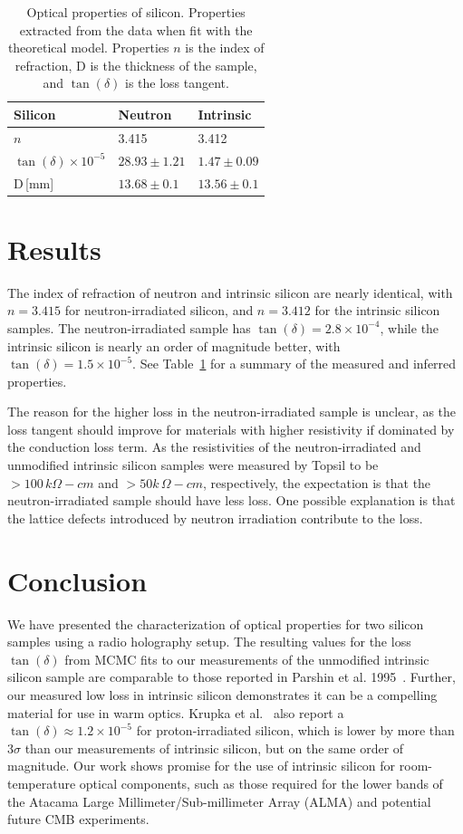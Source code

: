 \begin{table}
    \centering
\begin{tabular}{ |p{3cm}|p{3cm}|p{3cm}| }
 \hline
 Silicon & Neutron & Intrinsic\\
 \hline
  $n$ & 3.415 & 3.412 \\
 \hline
 $\tan(\delta)\times 10^{-5}$ & $28.93 \pm 1.21$ & $1.47 \pm 0.09$\\
 \hline
  D\,[mm] & $13.68 \pm 0.1 $ & $13.56 \pm 0.1$\\
 \hline
\end{tabular}
    \caption{Optical properties of silicon. Properties extracted from the data when fit with the theoretical model. Properties $n$ is the index of refraction, D is the thickness of the sample, and $\tan(\delta)$ is the loss tangent.}
    \label{tab:silicon}
\end{table}

\section{Results}
\label{sec:si_results}
The index of refraction of neutron and intrinsic silicon are nearly identical, with $n =3.415$ for neutron-irradiated silicon, and $n =3.412$ for the intrinsic silicon samples. The neutron-irradiated sample has $\tan(\delta) = 2.8\times10^{-4}$, while the intrinsic silicon is nearly an order of magnitude better, with $\tan(\delta)= 1.5 \times 10^{-5}$. See Table~\ref{tab:silicon} for a summary of the measured and inferred properties.

The reason for the higher loss in the neutron-irradiated sample is unclear, as the loss tangent should improve for materials with higher resistivity if dominated by the conduction loss term. As the resistivities of the neutron-irradiated and unmodified intrinsic silicon samples were measured by Topsil to be $>100\,k\Omega-cm$ and $>50k\,\Omega-cm$, respectively, the expectation is that the neutron-irradiated sample should have less loss. One possible explanation is that the lattice defects introduced by neutron irradiation contribute to the loss.

\section{Conclusion}
\label{sec:si_conclusion}
We have presented the characterization of optical properties for two silicon samples using a radio holography setup.  The resulting values for the loss $\tan(\delta)$ from MCMC fits to our measurements of the unmodified intrinsic silicon sample are comparable to those reported in Parshin et al. 1995~\cite{parshin}.  Further, our measured low loss in intrinsic silicon demonstrates it can be a compelling material for use in warm optics.  Krupka et al.~\cite{KRUPKA201676} also report a $\tan(\delta) \approx 1.2\times10^{-5}$ for proton-irradiated silicon, which is lower by more than $3\sigma$ than our measurements of intrinsic silicon, but on the same order of magnitude.  Our work shows promise for the use of intrinsic silicon for room-temperature optical components, such as those required for the lower bands of the Atacama Large Millimeter/Sub-millimeter Array (ALMA) and potential future CMB experiments.


